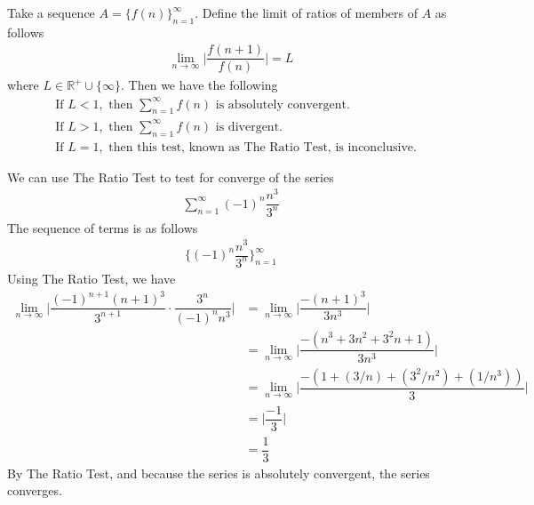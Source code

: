 \begin{theorem}
Take a sequence $A = \{f(n)\}_{n = 1}^{\infty}$. Define the limit of ratios of members of $A$ as follows
\begin{align*}
    \lim_{n \longrightarrow \infty} \Big\lvert \dfrac{f(n+1)}{f(n)} \Big\rvert = L
\end{align*}
where $L \in \mathbb{R^{+}} \cup \{\infty\}$. Then we have the following
\begin{align*}
    &\text{If} \hspace{4pt} L < 1, \hspace{4pt} \text{then} \hspace{4pt} \sum_{n = 1}^{\infty} f(n) \hspace{4pt} \text{is absolutely convergent.}\\[2ex]
    &\text{If} \hspace{4pt} L > 1, \hspace{4pt} \text{then} \hspace{4pt} \sum_{n = 1}^{\infty} f(n) \hspace{4pt} \text{is divergent.}\\[2ex]
    &\text{If} \hspace{4pt} L = 1, \hspace{4pt} \text{then this test, known as The Ratio Test, is inconclusive.}
\end{align*}
\end{theorem}

\begin{example}
We can use The Ratio Test to test for converge of the series
\begin{align*}
    \sum_{n = 1}^{\infty} (-1)^{n} \dfrac{n^{3}}{3^{n}}
\end{align*}
The sequence of terms is as follows
\begin{align*}
    \Big\{(-1)^{n} \dfrac{n^{3}}{3^{n}}\Big\}_{n = 1}^{\infty}
\end{align*}
Using The Ratio Test, we have
\begin{align*}
    \lim_{n \longrightarrow \infty} \Big\lvert \dfrac{(-1)^{n+1}(n+1)^{3}}{3^{n+1}} \cdot \dfrac{3^{n}}{(-1)^{n}n^{3}} \Big\rvert &= \lim_{n \longrightarrow \infty} \Big\lvert \dfrac{-(n+1)^{3}}{3n^{3}} \Big\rvert\\[2ex]
    &= \lim_{n \longrightarrow \infty} \Big\lvert \dfrac{-(n^{3} + 3n^{2} + 3^{2}n + 1)}{3n^{3}} \Big\rvert\\[2ex]
    &= \lim_{n \longrightarrow \infty} \Big\lvert \dfrac{-(1 + (3/n) + (3^{2}/n^{2}) + (1/n^{3}))}{3} \Big\rvert\\[2ex]
    &= \Big\lvert \dfrac{-1}{3} \Big\rvert\\[2ex]
    &= \dfrac{1}{3}
\end{align*}
By The Ratio Test, and because the series is absolutely convergent, the series converges. 
\end{example}

